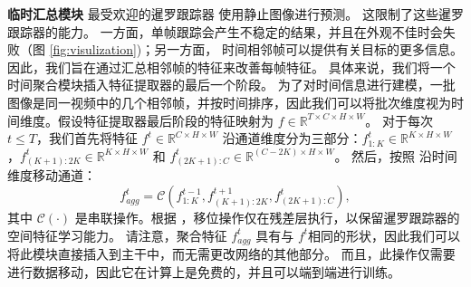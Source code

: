 \textbf{临时汇总模块}
最受欢迎的暹罗跟踪器 \cite{SiamRPN++, Wang2018SiamMask} 使用静止图像进行预测。%
这限制了这些暹罗跟踪器的能力。
一方面，单帧跟踪会产生不稳定的结果，并且在外观不佳时会失败（图 \ref{fig:visulization})；另一方面，
时间相邻帧可以提供有关目标的更多信息。
因此，我们旨在通过汇总相邻帧的特征来改善每帧特征。
具体来说，我们将一个时间聚合模块插入特征提取器的最后一个阶段。
为了对时间信息进行建模，一批图像是同一视频中的几个相邻帧，并按时间排序，因此我们可以将批次维度视为时间维度。假设特征提取器最后阶段的特征映射为 $f \in \mathbb R ^ {T \times C \times H \times W}$。
对于每次 $t \leq T$，我们首先将特征 $f^t \in \mathbb R ^ {C \times H \times W}$ 沿通道维度分为三部分：$f_{1:K}^t \in \mathbb R ^ {K \times H \times W}$，$f_{(K+1):2K}^t \in \mathbb R ^ {K \times H \times W}$ 和 $f_{(2K+1):C}^t \in \mathbb R ^ {(C-2K) \times H \times W}$。
然后，按照 \cite{lin2019tsm}沿时间维度移动通道：
\begin{equation}
    f_{agg}^t = \mathcal{C}(f_{{1:K}}^{t-1}, f_{(K+1):2K}^{t+1}, f_{(2K+1):C}^{t}),
\end{equation}
其中 $\mathcal{C}(\cdot)$ 是串联操作。根据 \cite{lin2019tsm}，移位操作仅在残差层执行，以保留暹罗跟踪器的空间特征学习能力。
请注意，聚合特征 $f_{agg}^t$ 具有与 $f^t$相同的形状，因此我们可以将此模块直接插入到主干中，而无需更改网络的其他部分。
而且，此操作仅需要进行数据移动，因此它在计算上是免费的，并且可以端到端进行训练。


